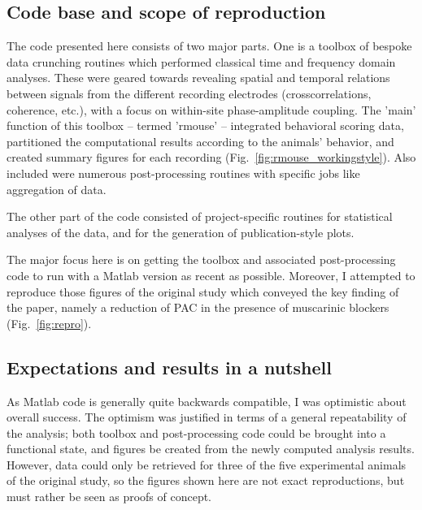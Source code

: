 \subsection{Code base and scope of reproduction}
The code presented here consists of two major parts. One is a toolbox of bespoke data crunching routines which performed classical time and frequency domain analyses. These were geared towards revealing spatial and temporal relations between signals from the different recording electrodes (crosscorrelations, coherence, etc.), with a focus on within-site phase-amplitude coupling. The 'main' function of this toolbox -- termed 'rmouse' -- integrated behavioral scoring data, partitioned the computational results according to the animals' behavior, and created summary figures for each recording (Fig.~\ref{fig:rmouse_workingstyle}). Also included were numerous post-processing routines with specific jobs like aggregation of data.

The other part of the code consisted of project-specific routines for statistical analyses of the data, and for the generation of publication-style plots.

The major focus here is on getting the toolbox and associated post-processing code to run with a Matlab version as recent as possible. Moreover, I attempted to reproduce those figures of the original study which conveyed the key finding of the paper, namely a reduction of PAC in the presence of muscarinic blockers (Fig.~\ref{fig:repro}).

\subsection{Expectations and results in a nutshell}
As Matlab code is generally quite backwards compatible, I was optimistic about overall success. The optimism was justified in terms of a general repeatability of the analysis; both toolbox and post-processing code could be brought into a functional state, and figures be created from the newly computed analysis results. However, data could only be retrieved for three of the five experimental animals of the original study, so the figures shown here are not exact reproductions, but must rather be seen as proofs of concept. 


